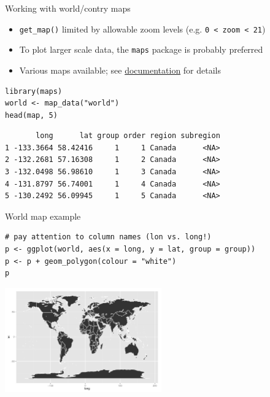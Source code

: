 \documentclass[sans,aspectratio=169,presentation,bigger,fleqn]{beamer}
\begin{document}
\begin{frame}[fragile,label=sec-10]{Working with world/contry maps}
 \begin{itemize}
\item \texttt{get\_map()} limited by allowable zoom levels (e.g. \texttt{0 < zoom < 21})
\item To plot larger scale data, the \texttt{maps} package is probably preferred
\item Various maps available; see \href{http://cran.r-project.org/web/packages/maps/maps.pdf}{documentation} for details
\end{itemize}

\scriptsize
\begin{verbatim}
library(maps)
world <- map_data("world")
head(map, 5)
\end{verbatim}

\begin{verbatim}
       long      lat group order region subregion
1 -133.3664 58.42416     1     1 Canada      <NA>
2 -132.2681 57.16308     1     2 Canada      <NA>
3 -132.0498 56.98610     1     3 Canada      <NA>
4 -131.8797 56.74001     1     4 Canada      <NA>
5 -130.2492 56.09945     1     5 Canada      <NA>
\end{verbatim}
\end{frame}
\begin{frame}[fragile,label=sec-11]{World map example}
 \scriptsize
\begin{verbatim}
# pay attention to column names (lon vs. long!)
p <- ggplot(world, aes(x = long, y = lat, group = group))
p <- p + geom_polygon(colour = "white")
p
\end{verbatim}

\begin{center}
\includegraphics[height=4.5cm]{./img/world.pdf}
\end{center}

\normalsize
\end{frame}
\end{document}
